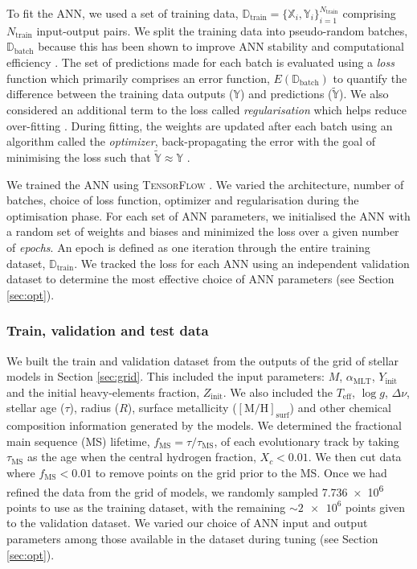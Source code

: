 \documentclass[a4paper,fleqn,usenatbib]{mnras}
\newcommand{\dnu}{\ensuremath{\Delta\nu}}
\newcommand{\metallicity}{\ensuremath{[\mathrm{M}/\mathrm{H}]}}
\newcommand{\teff}{\ensuremath{T_\mathrm{eff}}}
\newcommand{\mlt}{\ensuremath{{\alpha_\mathrm{MLT}}}}
\begin{document}
To fit the ANN, we used a set of training data, $\boldsymbol{\mathbb{D}}_\mathrm{train} = \{\boldsymbol{\mathbb{X}}_i, \boldsymbol{\mathbb{Y}}_i\}_{i=1}^{N_\mathrm{train}}$ comprising $N_\mathrm{train}$ input-output pairs. We split the training data into pseudo-random batches, $\boldsymbol{\mathbb{D}}_\mathrm{batch}$ because this has been shown to improve ANN stability and computational efficiency \citep{Masters.Luschi2018}. The set of predictions made for each batch is evaluated using a \emph{loss} function which primarily comprises an error function, $E(\boldsymbol{\mathbb{D}}_\mathrm{batch})$ to quantify the difference between the training data outputs ($\boldsymbol{\mathbb{Y}}$) and predictions ($\widetilde{\boldsymbol{\mathbb{Y}}}$). We also considered an additional term to the loss called \emph{regularisation} which helps reduce over-fitting \citep{Goodfellow.Bengio.ea2016}. During fitting, the weights are updated after each batch using an algorithm called the \emph{optimizer}, back-propagating the error with the goal of minimising the loss such that $\widetilde{\boldsymbol{\mathbb{Y}}} \approx \boldsymbol{\mathbb{Y}}$ \citep[see e.g.][]{Rumelhart.Hinton.ea1986}.

We trained the ANN using \textsc{TensorFlow} \citep{Abadi.Barham.ea2016}. We varied the architecture, number of batches, choice of loss function, optimizer and regularisation during the optimisation phase. For each set of ANN parameters, we initialised the ANN with a random set of weights and biases and minimized the loss over a given number of \emph{epochs}. An epoch is defined as one iteration through the entire training dataset, $\boldsymbol{\mathbb{D}}_\mathrm{train}$. We tracked the loss for each ANN using an independent validation dataset to determine the most effective choice of ANN parameters (see Section \ref{sec:opt}).

\subsubsection{Train, validation and test data}\label{sec:train}

We built the train and validation dataset from the outputs of the grid of stellar models in Section \ref{sec:grid}. This included the input parameters: $M$, $\mlt$, $Y_\mathrm{init}$ and the initial heavy-elements fraction, $Z_\mathrm{init}$. We also included the $\teff$, $\log g$, $\dnu$, stellar age ($\tau$), radius ($R$), surface metallicity ($\metallicity_\mathrm{surf}$) and other chemical composition information generated by the models. We determined the fractional main sequence (MS) lifetime, $f_{\mathrm{MS}} = \tau / \tau_{\mathrm{MS}}$, of each evolutionary track by taking $\tau_{\mathrm{MS}}$ as the age when the central hydrogen fraction, $X_c < 0.01$. We then cut data where $f_{\mathrm{MS}} < 0.01$ to remove points on the grid prior to the MS. Once we had refined the data from the grid of models, we randomly sampled \num{7.736e6} points to use as the training dataset, with the remaining $\sim \num{2e6}$ points given to the validation dataset. We varied our choice of ANN input and output parameters among those available in the dataset during tuning (see Section \ref{sec:opt}).
\end{document}
